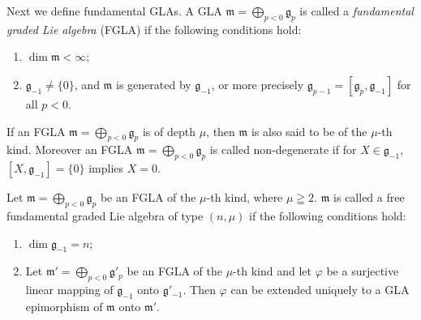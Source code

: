 \documentclass[pdftex]{sigma}
\numberwithin{equation}{section}
\numberwithin{theorem}{section}
\numberwithin{proposition}{section}
\numberwithin{lemma}{section}
\numberwithin{corollary}{section}
\numberwithin{definition}{section}
\numberwithin{example}{section}
\numberwithin{remark}{section}
\numberwithin{note}{section}
\begin{document}
Next we def\/ine fundamental GLAs.
A GLA $\mathfrak m=\bigoplus\limits_{p<0}\mathfrak g_p$ is
called a \textit{fundamental graded Lie algebra} (FGLA)
if the following conditions hold:
\begin{enumerate}\itemsep=0pt
\renewcommand{\labelenumi}{$(\roman{enumi})$}
\item $\dim \mathfrak m<\infty$;
\item $\mathfrak g_{-1}\ne\{0\}$, and $\mathfrak m$ is generated by $\mathfrak g_{-1}$,
or more precisely $\mathfrak g_{p-1}=[\mathfrak g_p,\mathfrak g_{-1}]$
for all $p<0$.
\end{enumerate}
If an FGLA $\mathfrak m=\bigoplus\limits_{p<0}\mathfrak g_p$
is of depth $\mu$, then $\mathfrak m$
is also said to be of the $\mu$-th kind.
Moreover an FGLA $\mathfrak m=\bigoplus\limits_{p<0}\mathfrak g_p$ is called non-degenerate if
for $X\in\mathfrak g_{-1}$, $[X,\mathfrak g_{-1}]=\{0\}$ implies $X=0$.
\par
Let $\mathfrak m=\bigoplus\limits_{p<0}\mathfrak g_p$ be an FGLA of
the $\mu$-th kind, where $\mu\geqq2$. $\mathfrak m$ is called a free
fundamental graded Lie algebra of type $(n,\mu)$
if the following conditions hold:
\begin{enumerate}\itemsep=0pt
\renewcommand{\labelenumi}{$(\roman{enumi})$}
\item $\dim \mathfrak g_{-1}=n$;
\item Let $\mathfrak m'=\bigoplus\limits_{p<0}\mathfrak g'_p$ be an FGLA
of the $\mu$-th kind and let $\varphi$ be a surjective linear
mapping of $\mathfrak g_{-1}$ onto $\mathfrak g'_{-1}$.
Then $\varphi$ can be extended uniquely to a GLA
epimorphism of $\mathfrak m$ onto $\mathfrak m'$.
\end{enumerate}
\end{document}
